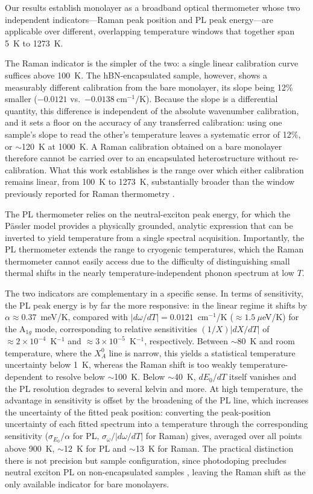 \documentclass[letterpaper]{article}
\DeclareRobustCommand{\rev}[1]{#1}
\begin{document}
Our results establish monolayer  as a broadband optical thermometer
whose two independent indicators---Raman peak position and PL peak energy---are
applicable over different, overlapping temperature windows that together span
5~K to 1273~K.

The Raman indicator is the simpler of the two: a single linear calibration
curve suffices above 100~K. The hBN-encapsulated sample, however, shows a
measurably different calibration from the bare monolayer, its slope being
12\% smaller ($-0.0121$ vs.\ $-0.0138~\mathrm{cm^{-1}/K}$). Because the slope
is a differential quantity, this difference is independent of the absolute
wavenumber calibration, and it sets a floor on the accuracy of any transferred
calibration: using one sample's slope to read the other's temperature leaves a
systematic error of 12\%, or $\sim$120~K at 1000~K. A Raman calibration
obtained on a bare monolayer therefore cannot be carried over to an
encapsulated heterostructure without re-calibration. What this work establishes
is the range over which either calibration remains linear, from 100~K to
1273~K, substantially broader than the window previously reported for
 Raman thermometry \cite{huang-2016}.

The PL thermometer relies on the neutral-exciton peak energy, for which the
Pässler model provides a physically grounded, analytic expression that can be
inverted to yield temperature from a single spectral acquisition.
Importantly, the PL thermometer extends the range to cryogenic temperatures,
which the Raman thermometer cannot easily access due to the difficulty of
distinguishing small thermal shifts in the nearly temperature-independent phonon
spectrum at low $T$.

The two indicators are complementary in a specific sense. \rev{In terms of
sensitivity, the PL peak energy is by far the more responsive: in the linear
regime it shifts by $\alpha \approx 0.37$~meV/K, compared with
$|d\omega/dT| = 0.0121$~cm$^{-1}$/K ($\approx 1.5~\mu$eV/K) for the A$_{1g}$
mode, corresponding to relative sensitivities $(1/X)|dX/dT|$ of
$\approx 2\times10^{-4}$~K$^{-1}$ and $\approx 3\times10^{-5}$~K$^{-1}$,
respectively. Between $\sim$80~K and room temperature, where the $X_A^0$ line
is narrow, this yields a statistical temperature uncertainty below 1~K,}
whereas the Raman shift is too weakly temperature-dependent to resolve below
$\sim$100~K. \rev{Below $\sim$40~K, $dE_0/dT$ itself vanishes and the PL
resolution degrades to several kelvin and more. At high temperature, the
advantage in sensitivity is offset by the broadening of the PL line, which
increases the uncertainty of the fitted peak position:} converting the
peak-position uncertainty of each fitted spectrum
into a temperature through the corresponding sensitivity ($\sigma_{E_0}/\alpha$
for PL, $\sigma_\omega/|d\omega/dT|$ for Raman) gives, averaged over all points
above 900~K, $\sim$12~K for PL and $\sim$13~K for Raman. The practical
distinction there is
not precision but sample configuration, since photodoping precludes \rev{neutral exciton} PL on
non-encapsulated samples \cite{cadiz-2016}, leaving the Raman shift as the only
available indicator for bare monolayers.
\end{document}
